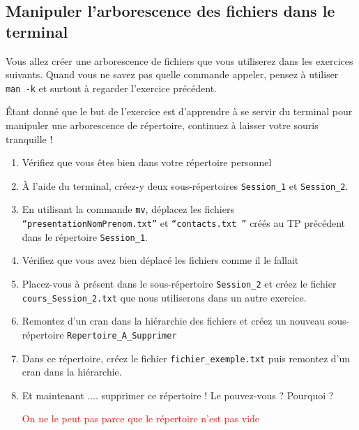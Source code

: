 \documentclass{article}
\begin{document}
\hypertarget{manipuler-larborescence-des-fichiers-dans-le-terminal}{
\subsection{Manipuler l'arborescence des fichiers dans le
terminal}\label{manipuler-larborescence-des-fichiers-dans-le-terminal}}

Vous allez créer une arborescence de fichiers que vous utiliserez dans les exercices suivants. Quand vous ne savez pas quelle commande appeler, pensez à utiliser \texttt{man\ -k} et surtout à regarder l'exercice précédent.

Étant donné que le but de l'exercice est d'apprendre à se servir du terminal pour
manipuler une arborescence de répertoire, continuez à laisser votre souris tranquille !

\begin{exercice}

\begin{enumerate}
\def\labelenumi{\arabic{enumi}.}
\item 
Vérifiez que vous êtes bien dans votre répertoire personnel
\item
  À l'aide du terminal, créez-y deux sous-répertoires \texttt{Session\_1} et \texttt{Session\_2}.
\item
  En utilisant la commande \texttt{mv}, déplacez les fichiers 
  \texttt{``presentationNomPrenom.txt''} et \texttt{``contacts.txt ''} créés au TP précédent dans le répertoire \texttt{Session\_1}.
\item
  Vérifiez que vous avez bien déplacé les fichiers comme il le fallait
\item
  Placez-vous à présent dans le sous-répertoire \texttt{Session\_2} et créez le fichier \texttt{cours\_{Session\_2}.txt} que nous utiliserons dans un autre exercice. 
\item
Remontez d'un cran dans la hiérarchie des fichiers et créez un nouveau sous-répertoire \texttt{Repertoire\_{A\_{Supprimer}}}
\item 
Dans ce répertoire, créez le fichier \texttt{fichier\_exemple.txt} puis remontez d'un cran dans la hiérarchie.
\item
Et maintenant .... supprimer ce répertoire ! Le pouvez-vous ? Pourquoi ? 

\begin{correction}
\textcolor{red}{On ne le peut pas parce que le répertoire n'est pas vide}
\end{correction}

\end{enumerate}

\end{exercice}
\end{document}
